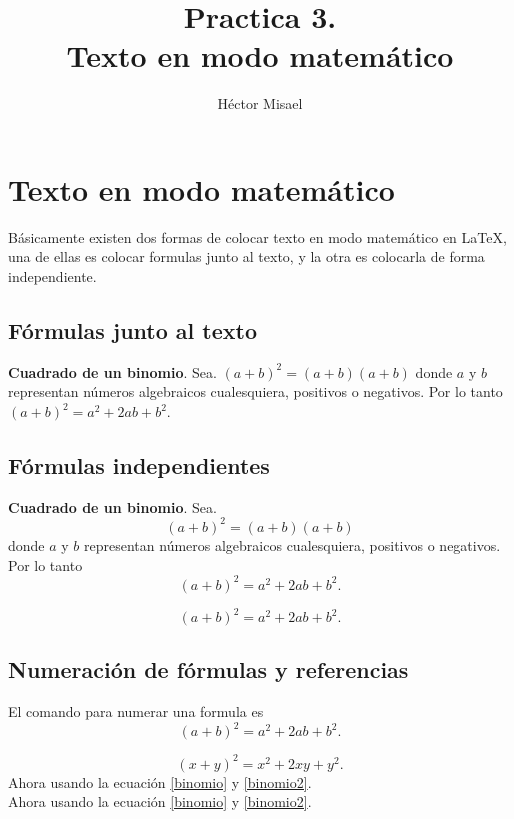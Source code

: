 \documentclass[12pt]{article}
\begin{document}
\title{Practica 3.\\ Texto en modo matemático }
\author{Héctor Misael}
\date{}
\maketitle
\tableofcontents

\section{Texto en modo matemático}
Básicamente existen dos formas de colocar texto en modo matemático en \LaTeX, una de ellas es colocar formulas junto al texto, y la otra es colocarla de forma independiente.
\subsection{Fórmulas junto al texto}
\textbf{Cuadrado de un binomio}. Sea. $ (a+b)^{2} = (a+b)(a+b) $ donde $a$ y $b$ representan números algebraicos cualesquiera, positivos o negativos. Por lo tanto $ (a+b)^{2} = a^{2} +2ab +b^{2} $.
\subsection{Fórmulas independientes}
\textbf{Cuadrado de un binomio}. Sea. 
\[
 (a+b)^{2} = (a+b)(a+b) 
\]
 donde $a$ y $b$ representan números algebraicos cualesquiera, positivos o negativos. Por lo tanto 
\[ 
  (a+b)^{2} = a^{2} +2ab +b^{2} .
\]

\begin{equation*}
 (a+b)^{2} = a^{2} +2ab +b^{2} .
\end{equation*}
\subsection{Numeración de fórmulas y referencias}
El comando para numerar una formula es 
\begin{equation}\label{binomio}
 (a+b)^{2} = a^{2} +2ab +b^{2} .
\end{equation}

\begin{equation}\label{binomio2}
 (x+y)^{2} = x^{2} +2xy +y^{2} .
\end{equation}
Ahora usando la ecuación \ref{binomio} y \ref{binomio2}. \\
Ahora usando la ecuación \eqref{binomio} y \eqref{binomio2}. 
\end{document}
